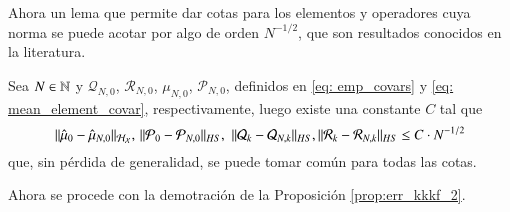 Ahora un lema que permite dar cotas para los elementos y operadores cuya norma se puede acotar por algo de orden $N^{-1/2}$, que son resultados conocidos en la literatura.
\begin{lema} Sea $N \in \mathbb{N}$ y $\mathcal{Q}_{N,0}$, $\mathcal{R}_{N,0}$, $\mu_{N,0}$, $\mathcal{P}_{N,0}$, definidos en \ref{eq: emp_covars} y \ref{eq: mean_element_covar}, respectivamente, luego existe una constante $C$ tal que
	\begin{equation*}
		\| \hat{\mu}_0 - \hat{\mu}_{N,0} \|_{\mathcal{H}_{\mathcal{X}}}, \, \|  \mathcal{P}_{0} -  \mathcal{P}_{N,0}\|_{HS}, \, \, \| \mathcal{Q}_{k} - \mathcal{Q}_{N, k} \|_{HS}, \| \mathcal{R}_{k} - \mathcal{R}_{N, k} \|_{HS} \leq C\cdot N^{-1/2}
	\end{equation*}
	que, sin pérdida de generalidad, se puede tomar común para todas las cotas.
	\label{lema:oper_sqrt_N}
\end{lema}
Ahora se procede con la demotración de la Proposición \ref{prop:err_kkkf_2}.
